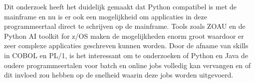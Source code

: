 Dit onderzoek heeft het duidelijk gemaakt dat Python compatibel is met de mainframe en nu is er ook een mogelijkheid om applicaties in deze programmeertaal direct te schrijven op de mainframe. Tools zoals ZOAU en de Python AI toolkit for z/OS maken de mogelijkheden enorm groot waardoor er zeer complexe applicaties geschreven kunnen worden. Door de afname van skills in COBOL en PL/1, is het interessant om te onderzoeken of Python en Java de oudere programmeertalen voor batch en online jobs volledig kan vervangen en of dit invloed zou hebben op de snelheid waarin deze jobs worden uitgevoerd.

